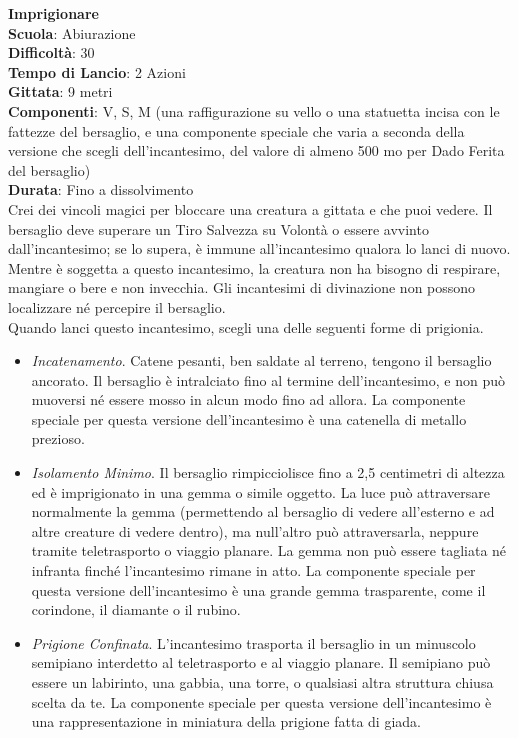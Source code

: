 \begin{multicols}{2}
\medskip\textbf{Imprigionare}\\
\textbf{Scuola}: Abiurazione\\
\textbf{Difficoltà}: 30\\
\textbf{Tempo di Lancio}: 2 Azioni\\
\textbf{Gittata}: 9 metri\\
\textbf{Componenti}: V, S, M (una raffigurazione su vello o una statuetta incisa con le fattezze del bersaglio, e una componente speciale che varia a seconda della versione che scegli dell'incantesimo, del valore di almeno 500 mo per Dado Ferita del bersaglio)\\
\textbf{Durata}: Fino a dissolvimento\\
Crei dei vincoli magici per bloccare una creatura a gittata e che puoi vedere. Il bersaglio deve superare un Tiro Salvezza su Volontà o essere avvinto dall'incantesimo; se lo supera, è immune all'incantesimo qualora lo lanci di nuovo. Mentre è soggetta a questo incantesimo, la creatura non ha bisogno di respirare, mangiare o bere e non invecchia. Gli incantesimi di divinazione non possono localizzare né percepire il bersaglio.\\
Quando lanci questo incantesimo, scegli una delle seguenti forme di prigionia.
\medskip
\begin{itemize}
\item
\textit{Incatenamento}. Catene pesanti, ben saldate al terreno, tengono il bersaglio ancorato. Il bersaglio è intralciato fino al termine dell'incantesimo, e non può muoversi né essere mosso in alcun modo fino ad allora. La componente speciale per questa versione dell'incantesimo è una catenella di metallo prezioso. 
\item
\textit{Isolamento Minimo}. Il bersaglio rimpicciolisce fino a 2,5 centimetri di altezza ed è imprigionato in una gemma o simile oggetto. La luce può attraversare normalmente la gemma (permettendo al bersaglio di vedere all'esterno e ad altre creature di vedere dentro), ma null'altro può attraversarla, neppure tramite teletrasporto o viaggio planare. La gemma non può essere tagliata né infranta finché l'incantesimo rimane in atto. La componente speciale per questa versione dell'incantesimo è una grande gemma trasparente, come il corindone, il diamante o il rubino.
\item
\textit{Prigione Confinata}. L'incantesimo trasporta il bersaglio in un minuscolo semipiano interdetto al teletrasporto e al viaggio planare. Il semipiano può essere un labirinto, una gabbia, una torre, o qualsiasi altra struttura chiusa scelta da te. La componente speciale per questa versione dell'incantesimo è una rappresentazione in miniatura della prigione fatta di giada.

\end{itemize}
\end{multicols}
